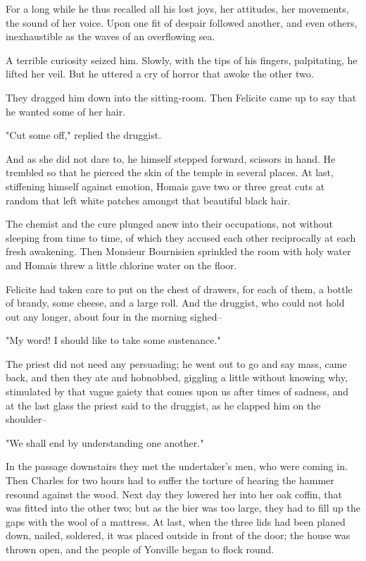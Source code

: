 \documentclass[11pt,twocolumn]{ltugboat}
\begin{document}
For a long while he thus recalled all his lost joys, her attitudes,
her movements, the sound of her voice. Upon one fit of despair followed
another, and even others, inexhaustible as the waves of an overflowing
sea.

A terrible curiosity seized him. Slowly, with the tips of his fingers,
palpitating, he lifted her veil. But he uttered a cry of horror that
awoke the other two.

They dragged him down into the sitting-room. Then Felicite came up to
say that he wanted some of her hair.

"Cut some off," replied the druggist.

And as she did not dare to, he himself stepped forward, scissors in
hand. He trembled so that he pierced the skin of the temple in several
places. At last, stiffening himself against emotion, Homais gave two
or three great cuts at random that left white patches amongst that
beautiful black hair.

The chemist and the cure plunged anew into their occupations, not
without sleeping from time to time, of which they accused each other
reciprocally at each fresh awakening. Then Monsieur Bournisien sprinkled
the room with holy water and Homais threw a little chlorine water on the
floor.

Felicite had taken care to put on the chest of drawers, for each
of them, a bottle of brandy, some cheese, and a large roll. And the
druggist, who could not hold out any longer, about four in the morning
sighed--

"My word! I should like to take some sustenance."

The priest did not need any persuading; he went out to go and say mass,
came back, and then they ate and hobnobbed, giggling a little without
knowing why, stimulated by that vague gaiety that comes upon us after
times of sadness, and at the last glass the priest said to the druggist,
as he clapped him on the shoulder--

"We shall end by understanding one another."

In the passage downstairs they met the undertaker's men, who were coming
in. Then Charles for two hours had to suffer the torture of hearing the
hammer resound against the wood. Next day they lowered her into her
oak coffin, that was fitted into the other two; but as the bier was
too large, they had to fill up the gaps with the wool of a mattress. At
last, when the three lids had been planed down, nailed, soldered, it was
placed outside in front of the door; the house was thrown open, and the
people of Yonville began to flock round.
\end{document}
